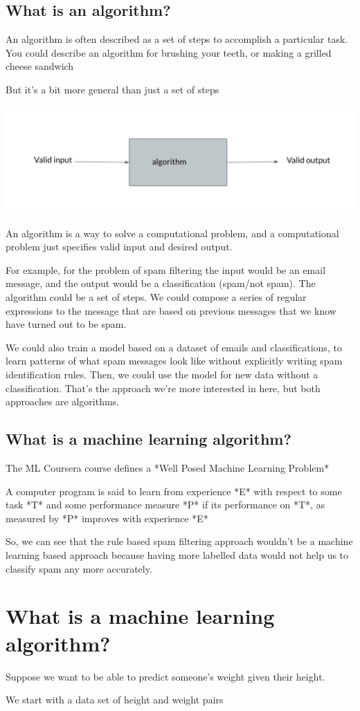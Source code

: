 \documentclass[12pt]{article}
\begin{document}
\subsection{What is an algorithm?}

An algorithm is often described as a set of steps to accomplish a particular task. You could describe an algorithm for brushing your teeth, or making a grilled cheese sandwich 

But it's a bit more general than just a set of steps 

\includegraphics[width={\textwidth}]{algo-abstract}


An algorithm is a way to solve a computational problem, and a computational problem just specifies valid input and desired output. 

For example, for the problem of spam filtering the input would be an email message, and the output would be a 
classification (spam/not spam). The algorithm could be a set of steps. We could compose a series of regular expressions to 
the message that are based on previous messages that we know have turned out to be spam. 

We could also train a model based on a dataset of emails and classifications, to learn patterns of what spam messages 
look like without explicitly writing spam identification rules. Then, we could use the model for new data without a 
classification. That's the approach we're more interested in here, but both approaches are algorithms.

\subsection{What is a machine learning algorithm?}


The ML Coursera course defines a *Well Posed Machine Learning Problem* 

A computer program is said to learn from experience *E* with respect to some task *T* and some performance measure *P* 
if its performance on *T*, as measured by *P* improves with experience *E*

So, we can see that the rule based spam filtering approach wouldn't be a machine learning based approach because having 
more labelled data would not help us to classify spam any more accurately. 

\section{What is a machine learning algorithm?}

Suppose we want to be able to predict someone's weight given their height. 

We start with a data set of height and weight pairs
\end{document}
